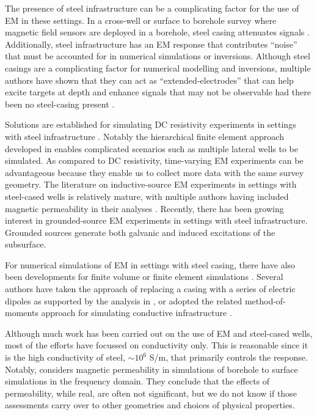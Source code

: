 \documentclass[onecolumn, extra, mreferee]{gji}
\begin{document}
The presence of steel infrastructure can be a complicating factor for the use of EM in these settings. In a cross-well or surface to borehole survey where magnetic field sensors are deployed in a borehole, steel casing attenuates signals \citep{augustin_theoretical_1989, Wu1994, Wilt1996, cuevas_analytical_2014}. Additionally, steel infrastructure has an EM response that contributes ``noise'' that must be accounted for in numerical simulations or inversions. Although steel casings are a complicating factor for numerical modelling and inversions, multiple authors have shown that they can act as ``extended-electrodes'' that can help excite targets at depth and enhance signals that may not be observable had there been no steel-casing present \citep{schenkel_electrical_1994, hoversten_hydro-frac_2015, yang_3d_2016, puzyrev_three-dimensional_2017}.

Solutions are established for simulating DC resistivity experiments in settings with steel infrastructure \cite{schenkel_electrical_1994, yang_3d_2016, heagy_direct_2019}. Notably the hierarchical finite element approach developed in \cite{Weiss2017} enables complicated scenarios such as multiple lateral wells to be simulated. As compared to DC resistivity, time-varying EM experiments can be advantageous because they enable us to collect more data with the same survey geometry. The literature on inductive-source EM experiments in settings with steel-cased wells is relatively mature, with multiple authors having included magnetic permeability in their analyses \citep{augustin_theoretical_1989, Wu1994, kaufman_influence_1996, Wilt1996}. Recently, there has been growing interest in grounded-source EM experiments in settings with steel infrastructure. Grounded sources generate both galvanic and induced excitations of the subsurface.

For numerical simulations of EM in settings with steel casing, there have also been developments for finite volume or finite element simulations \citep{Um2015, commer_transient-electromagnetic_2015, haber_modeling_2016, heagy_modeling_2019}. Several authors have taken the approach of replacing a casing with a series of electric dipoles as supported by the analysis in \citep{cuevas_analytical_2014}, or adopted the related method-of-moments approach for simulating conductive infrastructure \citep{tang_three-dimensional_2015, patzer_steel-cased_2017, kohnke_method_2018, orujov_electromagnetic_2020}.

Although much work has been carried out on the use of EM and steel-cased wells, most of the efforts have focussed on conductivity only. This is reasonable since it is the high conductivity of steel, $\sim 10^6$ S/m, that primarily controls the response. Notably, \cite{cuevas_effect_2018} considers magnetic permeability in simulations of borehole to surface simulations in the frequency domain. They conclude that the effects of permeability, while real, are often not significant, but we do not know if those assessments carry over to other geometries and choices of physical properties.
\end{document}
